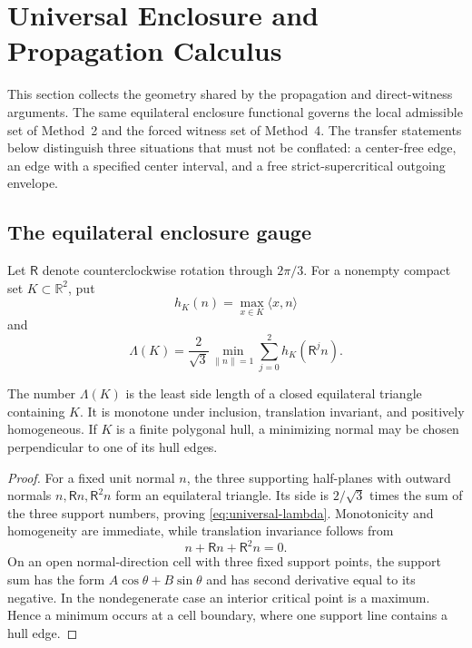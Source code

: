 \section{Universal Enclosure and Propagation Calculus}
\label{sec:universal-calculus}

This section collects the geometry shared by the propagation and direct-witness
arguments.  The same equilateral enclosure functional governs the local
admissible set of Method~2 and the forced witness set of Method~4.  The
transfer statements below distinguish three situations that must not be
conflated: a center-free edge, an edge with a specified center interval, and a
free strict-supercritical outgoing envelope.

\subsection{The equilateral enclosure gauge}

Let $\mathsf R$ denote counterclockwise rotation through $2\pi/3$.  For a
nonempty compact set $K\subset\mathbb R^2$, put
\[
 h_K(n)=\max_{x\in K}\langle x,n\rangle
\]
and
\begin{equation}
 \Lambda(K)=\frac2{\sqrt3}
 \min_{\lVert n\rVert=1}
 \sum_{j=0}^2h_K(\mathsf R^jn).
 \label{eq:universal-lambda}
\end{equation}

\begin{proposition}
\label{prop:universal-enclosure-gauge}
The number $\Lambda(K)$ is the least side length of a closed equilateral
triangle containing $K$.  It is monotone under inclusion, translation
invariant, and positively homogeneous.  If $K$ is a finite polygonal hull, a
minimizing normal may be chosen perpendicular to one of its hull edges.
\end{proposition}

\begin{proof}
For a fixed unit normal $n$, the three supporting half-planes with outward
normals $n,\mathsf Rn,\mathsf R^2n$ form an equilateral triangle.  Its side is
$2/\sqrt3$ times the sum of the three support numbers, proving
\eqref{eq:universal-lambda}.  Monotonicity and homogeneity are immediate, while
translation invariance follows from
\[
 n+\mathsf Rn+\mathsf R^2n=0.
\]
On an open normal-direction cell with three fixed support points, the support
sum has the form $A\cos\theta+B\sin\theta$ and has second derivative equal to
its negative.  In the nondegenerate case an interior critical point is a
maximum.  Hence a minimum occurs at a cell boundary, where one support line
contains a hull edge.
\end{proof}

